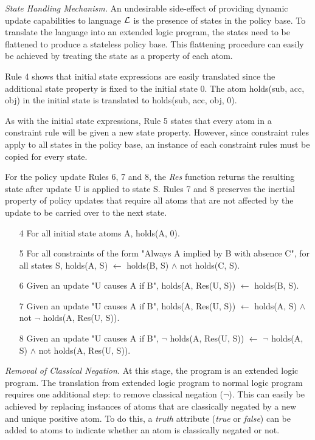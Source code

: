 \documentclass{llncs}
\begin{document}
    \emph{State Handling Mechanism.} An undesirable side-effect of providing
    dynamic update capabilities to language $\cal{L}$ is the presence of
    states in the policy base. To translate the language into an extended
    logic program, the states need to be flattened to produce a stateless
    policy base. This flattening procedure can easily be achieved by treating
    the state as a property of each atom. 

    Rule 4 shows that initial state expressions are easily translated since
    the additional state property is fixed to the initial state 0. The atom
    holds(sub, acc, obj) in the initial state is translated to holds(sub,
    acc, obj, 0).

    As with the initial state expressions, Rule 5 states that every atom in a
    constraint rule will be given a new state property. However, since
    constraint rules apply to all states in the policy base, an instance of
    each constraint rules must be copied for every state.

    For the policy update Rules 6, 7 and 8, the \emph{Res} function returns
    the resulting state after update U is applied to state S. Rules 7 and
    8 preserves the inertial property of policy updates that require all atoms
    that are not affected by the update to be carried over to the next state.

    \begin{enumerate}
      \item[4]
        For all initial state atoms A, holds(A, 0).
      \item[5]
        For all constraints of the form "Always A implied by B with
        absence C", for all states S, holds(A, S) $\leftarrow$ holds(B, S)
        $\land$ not holds(C, S).
      \item[6]
        Given an update "U causes A if B", holds(A, Res(U, S)) $\leftarrow$
        holds(B, S).
      \item[7]
        Given an update "U causes A if B", holds(A, Res(U, S)) $\leftarrow$
        holds(A, S) $\land$ not $\lnot$ holds(A, Res(U, S)).
      \item[8]
        Given an update "U causes A if B", $\lnot$ holds(A, Res(U, S))
        $\leftarrow$ $\lnot$ holds(A, S) $\land$ not holds(A, Res(U, S)).
    \end{enumerate}

    \emph{Removal of Classical Negation.} At this stage, the program is an
    extended logic program. The translation from extended logic program to
    normal logic program requires one additional step: to remove classical
    negation ($\lnot$). This can easily be achieved by replacing instances of
    atoms that are classically negated by a new and unique positive atom. To do
    this, a \emph{truth} attribute (\emph{true} or \emph{false}) can be added
    to atoms to indicate whether an atom is classically negated or not.
\end{document}

